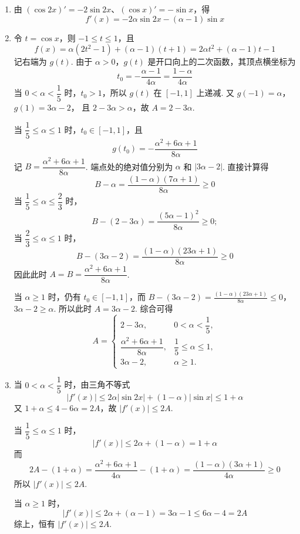 \begin{solution}
\begin{enumerate}
\item 由 \((\cos 2x)'=-2\sin 2x\)、\((\cos x)'=-\sin x\)，得
\[
f'(x)=-2\alpha\sin 2x-(\alpha-1)\sin x
\]

\item 令 \(t=\cos x\)，则 \(-1\le t\le1\)，且
\[
f(x)=\alpha(2t^2-1)+(\alpha-1)(t+1)=2\alpha t^2+(\alpha-1)t-1
\]
记右端为 \(g(t)\). 由于 \(\alpha>0\)，\(g(t)\) 是开口向上的二次函数，其顶点横坐标为
\[
t_0=-\frac{\alpha-1}{4\alpha}=\frac{1-\alpha}{4\alpha}
\]
当 \(0<\alpha<\dfrac15\) 时，\(t_0>1\)，所以 \(g(t)\) 在 \([-1,1]\) 上递减. 又
\(g(-1)=\alpha\)，\(g(1)=3\alpha-2\)，
且 \(2-3\alpha>\alpha\)，故 \(A=2-3\alpha\).

当 \(\dfrac15\le\alpha\le1\) 时，\(t_0\in[-1,1]\)，且
\[
g(t_0)=-\frac{\alpha^2+6\alpha+1}{8\alpha}
\]
记 \(B=\dfrac{\alpha^2+6\alpha+1}{8\alpha}\). 端点处的绝对值分别为 \(\alpha\) 和 \(|3\alpha-2|\). 直接计算得
\[
B-\alpha=\frac{(1-\alpha)(7\alpha+1)}{8\alpha}\ge0
\]
当 \(\dfrac15\le\alpha\le\dfrac23\) 时，
\[
B-(2-3\alpha)=\frac{(5\alpha-1)^2}{8\alpha}\ge0;
\]
当 \(\dfrac23\le\alpha\le1\) 时，
\[
B-(3\alpha-2)=\frac{(1-\alpha)(23\alpha+1)}{8\alpha}\ge0
\]
因此此时 \(A=B=\dfrac{\alpha^2+6\alpha+1}{8\alpha}\).

当 \(\alpha\ge1\) 时，仍有 \(t_0\in[-1,1]\)，而
\(B-(3\alpha-2)=\frac{(1-\alpha)(23\alpha+1)}{8\alpha}\le0\)，\(3\alpha-2\ge\alpha\).
所以此时 \(A=3\alpha-2\). 综合可得
\[
A=\begin{cases}
2-3\alpha,&0<\alpha<\dfrac15,\\[4pt]
\dfrac{\alpha^2+6\alpha+1}{8\alpha},&\dfrac15\le\alpha\le1,\\[8pt]
3\alpha-2,&\alpha\ge1.
\end{cases}
\]

\item 当 \(0<\alpha<\dfrac15\) 时，由三角不等式
\[
|f'(x)|\le2\alpha|\sin2x|+(1-\alpha)|\sin x|\le1+\alpha
\]
又 \(1+\alpha\le4-6\alpha=2A\)，故 \(|f'(x)|\le2A\).

当 \(\dfrac15\le\alpha\le1\) 时，
\[
|f'(x)|\le2\alpha+(1-\alpha)=1+\alpha
\]
而
\[
2A-(1+\alpha)=\frac{\alpha^2+6\alpha+1}{4\alpha}-(1+\alpha)=\frac{(1-\alpha)(3\alpha+1)}{4\alpha}\ge0
\]
所以 \(|f'(x)|\le2A\).

当 \(\alpha\ge1\) 时，
\[
|f'(x)|\le2\alpha+(\alpha-1)=3\alpha-1\le6\alpha-4=2A
\]
综上，恒有 \(|f'(x)|\le2A\).
\end{enumerate}
\end{solution}

